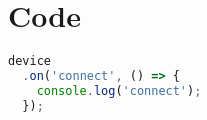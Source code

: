 
\chapter{Code}

\begin{lstlisting}[frame=single, language=JavaScript,
    caption=WebSockets Code, label=lst:websockets]
device
  .on('connect', () => {
    console.log('connect');
  });
\end{lstlisting}
